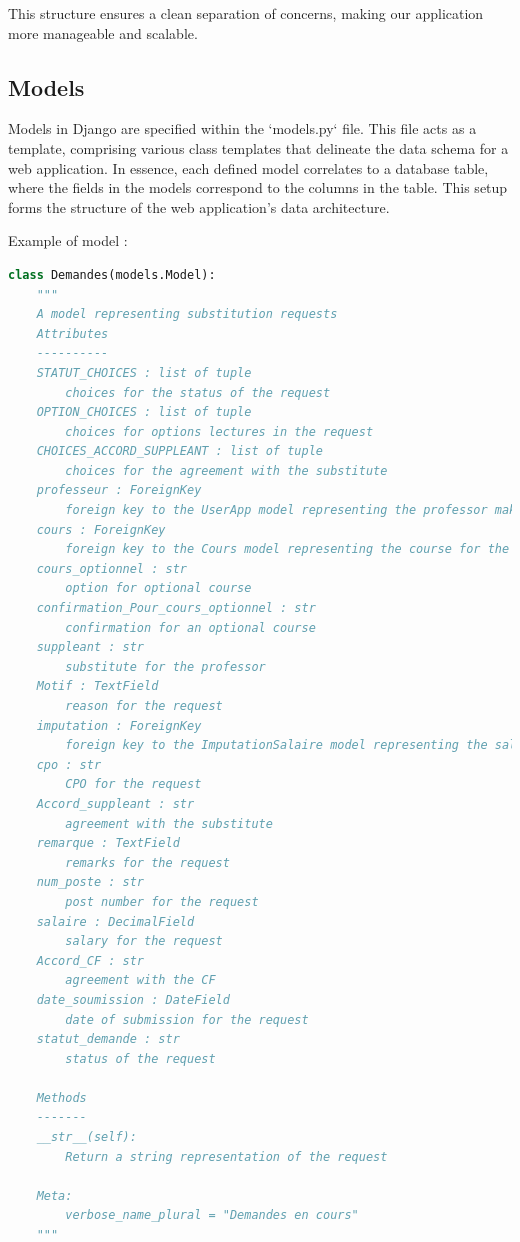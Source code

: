 \documentclass[12pt]{article}
\begin{document}
This structure ensures a clean separation of concerns, making our application more manageable and scalable.

\subsection{Models}
Models in Django are specified within the `models.py` file. This file acts as a template, comprising various class templates that delineate the data schema for a web application. In essence, each defined model correlates to a database table, where the fields in the models correspond to the columns in the table. This setup forms the structure of the web application's data architecture.

Example of model :

\begin{lstlisting}[language=Python]
class Demandes(models.Model):
    """
    A model representing substitution requests
    Attributes
    ----------
    STATUT_CHOICES : list of tuple
        choices for the status of the request
    OPTION_CHOICES : list of tuple
        choices for options lectures in the request
    CHOICES_ACCORD_SUPPLEANT : list of tuple
        choices for the agreement with the substitute
    professeur : ForeignKey
        foreign key to the UserApp model representing the professor making the request
    cours : ForeignKey
        foreign key to the Cours model representing the course for the request
    cours_optionnel : str
        option for optional course
    confirmation_Pour_cours_optionnel : str
        confirmation for an optional course
    suppleant : str
        substitute for the professor
    Motif : TextField
        reason for the request
    imputation : ForeignKey
        foreign key to the ImputationSalaire model representing the salary allocation
    cpo : str
        CPO for the request
    Accord_suppleant : str
        agreement with the substitute
    remarque : TextField
        remarks for the request
    num_poste : str
        post number for the request
    salaire : DecimalField
        salary for the request
    Accord_CF : str
        agreement with the CF
    date_soumission : DateField
        date of submission for the request
    statut_demande : str
        status of the request

    Methods
    -------
    __str__(self):
        Return a string representation of the request
    
    Meta:
        verbose_name_plural = "Demandes en cours"
    """


\end{lstlisting}
\end{document}
